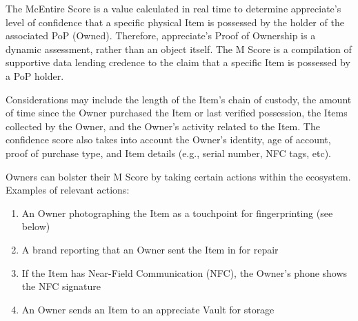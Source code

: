 \documentclass[a4paper,onecolumn, 10.5pt]{article}
\begin{document}
The McEntire Score is a value calculated in real time to determine appreciate’s level of confidence that a specific physical Item is possessed by the holder of the associated PoP (Owned).  Therefore, appreciate’s Proof of Ownership is a dynamic assessment, rather than an object itself.  The M Score is a compilation of supportive data lending credence to the claim that a specific Item is possessed by a PoP holder.

Considerations may include the length of the Item’s chain of custody, the amount of time since the Owner purchased the Item or last verified possession, the Items collected by the Owner, and the Owner’s activity related to the Item. The confidence score also takes into account the Owner’s identity, age of account, proof of purchase type, and Item details (e.g., serial number, NFC tags, etc).

Owners can bolster their M Score by taking certain actions within the ecosystem.
Examples of relevant actions:
\begin{enumerate}
	\setlength{\itemsep}{0pt}
	\item An Owner photographing the Item as a touchpoint for fingerprinting (see below)
	\item  A brand reporting that an Owner sent the Item in for repair
	\item If the Item has Near-Field Communication (NFC), the Owner’s phone shows the NFC signature
	\item An Owner sends an Item to an appreciate Vault for storage
\end{enumerate}
\end{document}
